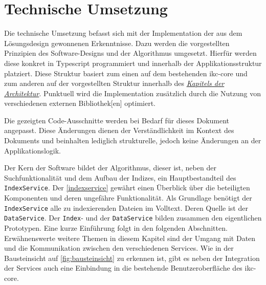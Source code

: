 

\chapter{Technische Umsetzung} \label{implementation}

Die technische Umsetzung befasst sich mit der Implementation der aus dem Lösungsdesign gewonnenen Erkenntnisse. Dazu werden die vorgestellten Prinzipien des Software-Designs und der Algorithmus umgesetzt. Hierfür werden diese konkret in \gls{Typescript} programmiert und innerhalb der Applikationsstruktur platziert. Diese Struktur basiert zum einen auf dem bestehenden \gls{ikc-core} und zum anderen auf der vorgestellten Struktur innerhalb des \hyperref[architecture]{\textit{Kapitels der Architektur}}. Punktuell wird die Implementation zusätzlich durch die Nutzung von verschiedenen externen \gls{Bibliothek}[en] optimiert.

Die gezeigten Code-Ausschnitte werden bei Bedarf für dieses Dokument angepasst. Diese Änderungen dienen der Verständlichkeit im Kontext des Dokuments und beinhalten lediglich strukturelle, jedoch keine Änderungen an der Applikationslogik.






Der Kern der Software bildet der Algorithmus, dieser ist, neben der Suchfunktionalität und dem Aufbau der Indizes, ein Hauptbestandteil des \texttt{IndexService}. Der \autoref{indexservice} gewährt einen Überblick über die beteiligten Komponenten und deren ungefähre Funktionalität. Als Grund\-la\-ge benötigt der \texttt{In\-dex\-Ser\-vice} alle zu indexierenden Dateien im Volltext. Deren Quelle ist der \texttt{Data\-Ser\-vice}. Der \texttt{Index}- und der \texttt{Da\-ta\-Ser\-vi\-ce} bilden zusammen den eigentlichen Prototypen. Eine kurze Einführung folgt in den folgenden Abschnitten. Er\-wähn\-ens\-wer\-te weitere Themen in diesem Kapitel sind der Umgang mit Daten und die Kommunikation zwischen den verschiedenen Services. Wie in der Bausteinsicht auf \autoref{fig:bausteinsicht} zu erkennen ist, gibt es neben der Integration der Services auch eine Einbindung in die bestehende Benutzeroberfläche des \gls{ikc-core}.

